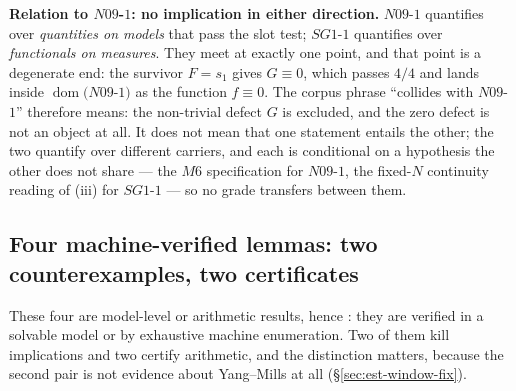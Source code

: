 \smallskip
\noindent\textbf{Relation to $N09$-$1$: no implication in either direction.} $N09$-$1$ quantifies
over \emph{quantities on models} that pass the slot test; $SG1$-$1$ quantifies over
\emph{functionals on measures}. They meet at exactly one point, and that point is a degenerate end:
the survivor $F=s_1$ gives $G\equiv0$, which passes $4/4$ and lands inside $\operatorname{dom}(N09$-$1)$
as the function $f\equiv0$. The corpus phrase ``collides with $N09$-$1$'' therefore means: the
non-trivial defect $G$ is excluded, and the zero defect is not an object at all. It does not mean
that one statement entails the other; the two quantify over different carriers, and each is
conditional on a hypothesis the other does not share --- the $M6$ specification for $N09$-$1$, the
fixed-$N$ continuity reading of (iii) for $SG1$-$1$ --- so no grade transfers between them.

\subsection{Four machine-verified lemmas: two counterexamples, two certificates}
\label{sec:est-counter}

\noindent These four are model-level or arithmetic results, hence \LM: they are verified in a
solvable model or by exhaustive machine enumeration. Two of them kill implications and two certify
arithmetic, and the distinction matters, because the second pair is not evidence about Yang--Mills at
all (\S\ref{sec:est-window-fix}).

